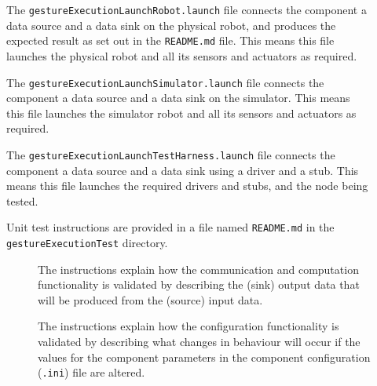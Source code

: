 \documentclass{CSSRforAfrica}
\newcommand{\checkboxChecked}{\fbox{\ding{51}}} %
\newcommand{\checkboxDashed}{\fbox{--}}         %
\begin{document}
\begin{description}
\item[\checkboxDashed] The {\small \verb+gestureExecutionLaunchRobot.launch+} file  connects the component a data source and a data sink on the physical robot, and produces the expected result as set out in the  {\small \verb+README.md+}  file.    This means this file launches the physical robot and all its sensors and actuators as required.

\item[\checkboxDashed] The {\small \verb+gestureExecutionLaunchSimulator.launch+} file  connects the component a data source and a data sink on the simulator.   This means this file launches the simulator robot and all its sensors and actuators as required.

\item[\checkboxDashed] The {\small \verb+gestureExecutionLaunchTestHarness.launch+} file  connects the component a data source and a data sink using a driver and a stub.   This means this file launches the required drivers and stubs, and the node being tested.

\item[\checkboxChecked] Unit test instructions are provided in a file named {\small \verb+README.md+} in the  {\small \verb+gestureExecutionTest+} directory. 


\begin{description}

\item[\checkboxChecked] The instructions explain how the communication and computation functionality is validated by describing the (sink) output data that will be produced from the (source) input data.  

\item[\checkboxChecked] The instructions explain how the configuration functionality is validated by describing what changes in behaviour will occur if the values for the component parameters in the component configuration ({\small \verb+.ini+}) file are altered.

\end{description}

\end{description} 


  
%  
\end{document}
